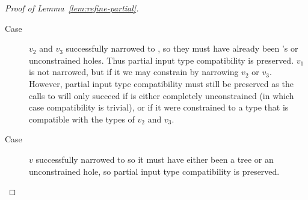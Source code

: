 \begin{proof}[Proof of Lemma~\ref{lem:refine-partial}]
\begin{description}
  \item[Case \renodegood]
    $v_2$ and $v_3$ successfully narrowed to , so they must have
    already been 's or unconstrained holes. Thus partial input type
    compatibility is preserved.
    $v_1$ is not narrowed, but if it \vhole{\thole} we may constrain
    \thole by narrowing $v_2$ or $v_3$. However, partial input type
    compatibility must still be preserved as the calls to \forcesym will
    only succeed if \thole is either completely unconstrained (in which
    case compatibility is trivial), or if it were constrained to a type
    that is compatible with the types of $v_2$ and $v_3$.


  \item[Case ] $v$ successfully narrowed to
    \ttree{\thole} so it must have either been a tree or an
    unconstrained hole, so partial input type compatibility is
    preserved.

  \end{description}
\end{proof}

